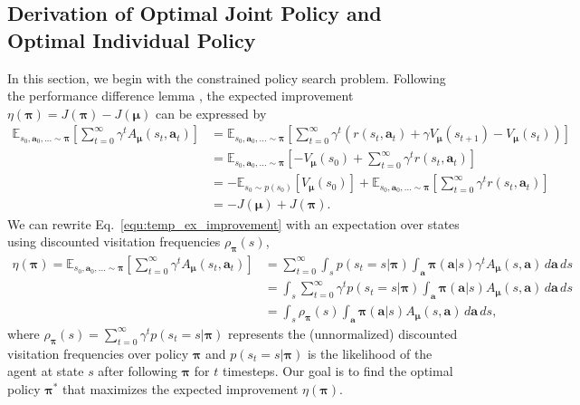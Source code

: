 \documentclass[11pt]{article}
\theoremstyle{plain}
\theoremstyle{remark}
\begin{document}
\subsection{Derivation of Optimal Joint Policy and Optimal Individual Policy} \label{appendix:a-2}
In this section, we begin with the constrained policy search problem. Following the performance difference lemma \citep{Langford02icml}, the expected improvement $\eta(\boldsymbol{\pi})=J(\boldsymbol{\pi}) - J(\boldsymbol{\mu})$ can be expressed by
\begin{align}
    \mathbb{E}_{s_0, \boldsymbol{a}_0, ... \sim \boldsymbol{\pi}}\left[\sum_{t=0}^{\infty}\gamma^{t}A_{\boldsymbol{\mu}}(s_t, \boldsymbol{a}_t)\right] &= \mathbb{E}_{s_0, \boldsymbol{a}_0, ... \sim \boldsymbol{\pi}} \left[ \sum_{t=0}^{\infty}\gamma^{t}\left( r(s_t, \boldsymbol{a}_t) + \gamma V_{\boldsymbol{\mu}}(s_{t+1}) - V_{\boldsymbol{\mu}}(s_{t}) \right) \right] \nonumber \\
    &= \mathbb{E}_{s_0, \boldsymbol{a}_0, ... \sim \boldsymbol{\pi}} \left[ -V_{\boldsymbol{\mu}}(s_0) + \sum_{t=0}^{\infty}\gamma^t r(s_t, \boldsymbol{a}_t) \right] \nonumber \\
    &= -\mathbb{E}_{s_0 \sim p(s_0)}\left[ V_{\boldsymbol{\mu}}(s_0) \right] + \mathbb{E}_{s_0, \boldsymbol{a}_0, ... \sim \boldsymbol{\pi}} \left[ \sum_{t=0}^{\infty}\gamma^t r(s_t, \boldsymbol{a}_t) \right] \nonumber \\
    &= -J(\boldsymbol{\mu}) + J(\boldsymbol{\pi}). \label{equ:temp_ex_improvement}
\end{align}
We can rewrite Eq.~\eqref{equ:temp_ex_improvement} with an expectation over states using discounted visitation frequencies $\rho_{\boldsymbol{\pi}}(s)$,
\begin{align}
    \eta(\boldsymbol{\pi}) = \mathbb{E}_{s_0, \boldsymbol{a}_0, ... \sim \boldsymbol{\pi}}\left[\sum_{t=0}^{\infty}\gamma^{t}A_{\boldsymbol{\mu}}(s_t, \boldsymbol{a}_t)\right] &= \sum_{t=0}^{\infty}\int_{s}p(s_t=s|\boldsymbol{\pi})\int_{\boldsymbol{a}}\boldsymbol{\pi}(\boldsymbol{a}|s)\gamma^t A_{\boldsymbol{\mu}}(s, \boldsymbol{a})\,d\boldsymbol{a}\,ds \nonumber \\
    &= \int_{s}\sum_{t=0}^{\infty}\gamma^tp(s_t=s|\boldsymbol{\pi}) \int_{\boldsymbol{a}}\boldsymbol{\pi}(\boldsymbol{a}|s)A_{\boldsymbol{\mu}}(s, \boldsymbol{a})\,d\boldsymbol{a}\,ds \nonumber \\
    &= \int_{s}\rho_{\boldsymbol{\pi}}(s)\int_{\boldsymbol{a}}\boldsymbol{\pi}(\boldsymbol{a}|s)A_{\boldsymbol{\mu}}(s, \boldsymbol{a})\,d\boldsymbol{a}\,ds, \label{equ:primal_obj}
\end{align}
where $\rho_{\boldsymbol{\pi}}(s) = \sum_{t=0}^{\infty}\gamma^tp(s_t=s|\boldsymbol{\pi})$ represents the (unnormalized) discounted visitation frequencies over policy $\boldsymbol{\pi}$ and $p(s_t=s|\boldsymbol{\pi})$ is the likelihood of the agent at state $s$ after following $\boldsymbol{\pi}$ for $t$ timesteps. Our goal is to find the optimal policy $\boldsymbol{\pi}^{*}$ that maximizes the expected improvement $\eta(\boldsymbol{\pi})$.
\end{document}
